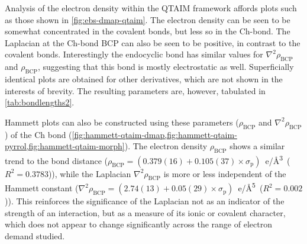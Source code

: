 \begin{refsection}
Analysis of the electron density within the QTAIM framework affords plots such as those shown in \cref{fig:ebs-dmap-qtaim}.
The electron density can be seen to be somewhat concentrated in the covalent  bonds, but less so in the Ch-bond.
The Laplacian at the Ch-bond BCP can also be seen to be positive, in contrast to the covalent bonds.
Interestingly the endocyclic  bond has similar values for $\nabla^2\rho_{\text{BCP}}$ and $\rho_\text{BCP}$, suggesting that this bond is mostly electrostatic as well.
Superficially identical plots are obtained for other derivatives, which are not shown in the interests of brevity.
The resulting parameters are, however, tabulated in \cref{tab:bondlengths2}.

Hammett plots can also be constructed using these parameters ($\rho_\text{BCP}$ and $\nabla^2\rho_{\text{BCP}}$) of the Ch bond (\cref{fig:hammett-qtaim-dmap,fig:hammett-qtaim-pyrrol,fig:hammett-qtaim-morph}).
The electron density $\rho_\text{BCP}$ shows a similar trend to the bond distance ($\rho_{\text{BCP}} = (0.379(16) + 0.105(37) \times \sigma_\text{p})$~e/\AA\textsuperscript{3}~($R^2=0.3783$)), while the Laplacian $\nabla^2\rho_{\text{BCP}}$ is more or less independent of the Hammett constant ($\nabla^2\rho_{\text{BCP}} = (2.74(13) + 0.05(29) \times \sigma_\text{p})$~e/\AA\textsuperscript{5}~($R^2=0.002$)).
This reinforces the significance of the Laplacian not as an indicator of the strength of an interaction, but as a measure of its ionic or covalent character, which does not appear to change significantly across the range of electron demand studied.


\end{refsection}
